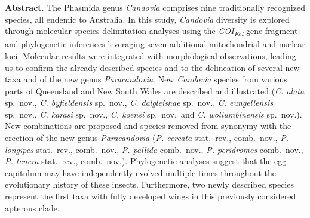 \vspace{4mm}

\textbf{Abstract}. The Phasmida genus \textit{Candovia} comprises nine traditionally recognized species, all endemic to Australia. In this study, \textit{Candovia} diversity is explored through molecular species-delimitation analyses using the \textit{COI\textsubscript{Fol}} gene fragment and phylogenetic inferences leveraging seven additional mitochondrial and nuclear loci. Molecular results were integrated with morphological observations, leading us to confirm the already described species and to the delineation of several new taxa and of the new genus \textit{Paracandovia}. New \textit{Candovia} species from various parts of Queensland and New South Wales are described and illustrated (\textit{C. alata} sp.\ nov., \textit{C. byfieldensis} sp.\ nov., \textit{C. dalgleishae} sp.\ nov., \textit{C. eungellensis} sp.\ nov., \textit{C. karasi} sp.\ nov., \textit{C. koensi} sp.\ nov.\ and \textit{C. wollumbinensis} sp.\ nov.). New combinations are proposed and species removed from synonymy with the erection of the new genus \textit{Paracandovia} (\textit{P. cercata} stat.\ rev., comb.\ nov., \textit{P. longipes} stat.\ rev., comb.\ nov., \textit{P. pallida} comb.\ nov., \textit{P. peridromes} comb.\ nov., \textit{P. tenera} stat.\ rev., comb.\ nov.). Phylogenetic analyses suggest that the egg capitulum may have independently evolved multiple times throughout the evolutionary history of these insects. Furthermore, two newly described species represent the first taxa with fully developed wings in this previously considered apterous clade.

\clearpage


